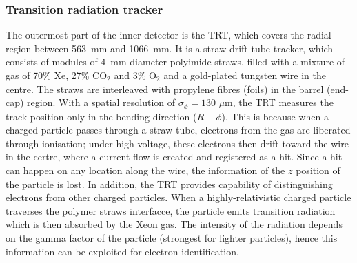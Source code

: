 	\subsubsection{Transition radiation tracker}
	The outermost part of the inner detector is the TRT, which covers
	the radial region between 563~mm and 1066~mm. 
	It is a straw drift tube tracker, which consists of
	modules of 4~mm diameter polyimide straws, filled with a mixture of gas of
	70\% Xe, 27\% CO$_2$ and 3\% O$_2$ 
	and a gold-plated tungsten wire in the centre. 
	The straws are interleaved with propylene fibres (foils) in the barrel (end-cap)
	region.
	With a spatial resolution of $\sigma_\phi = 130$ \textrm{$\mu$m}, 
	the TRT measures the track position only in the bending direction
	($R-\phi$). This is because when
	a charged particle passes through a straw tube, electrons from the gas
	are liberated through ionisation; under high voltage, these electrons then drift toward the 
	wire in the certre, where a current flow is created and registered as a hit.
	Since a hit can happen on any location along the wire,
	the information of the $z$ position of the particle is lost. 
	In addition, the TRT provides capability of distinguishing electrons from other
	charged particles. When a highly-relativistic charged particle traverses the
	polymer straws interfacce, the particle emits transition radiation which is then absorbed 
	by the Xeon gas. The intensity of the radiation
	depends on the gamma factor of the particle (strongest for lighter particles), hence this information
	can be exploited for electron identification. 

